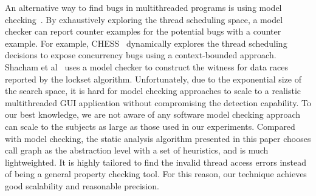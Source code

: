 An alternative way to find bugs in multithreaded programs is using model checking~\cite{Nori:2010:ESO, Inverardi:2000, Siegel:2008}.
By exhaustively exploring the thread scheduling space, a model checker can
report counter examples for the potential bugs with a counter example. For example,
CHESS~\cite{chess} dynamically explores the thread scheduling decisions to expose
concurrency bugs using a context-bounded approach. Shacham et al~\cite{Shacham:2007} uses
a model checker to construct the witness for data races reported by the lockset algorithm.
Unfortunately, due to the exponential size of the search space,
 it is hard for model checking approaches to scale to a realistic multithreaded GUI application
 without compromising the detection capability. To our best knowledge,
we are not aware of any software model checking approach can scale to the subjects
as large as those used in our experiments. Compared with model checking, the static analysis
algorithm presented in this paper chooses call graph as the
abstraction level with a set of heuristics, and is much lightweighted. It is highly tailored to find the invalid thread
access errors instead of being a general property checking tool. For this reason,
our technique achieves good scalability and reasonable precision.



